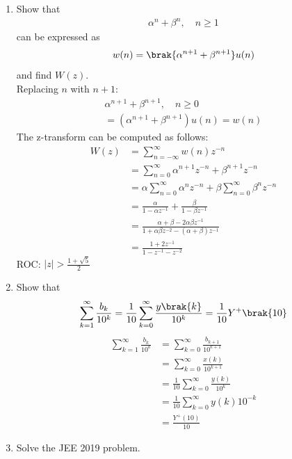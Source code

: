 \documentclass[journal,12pt,twocolumn]{IEEEtran}
\renewcommand\thesection{\arabic{section}}
\begin{document}
\begin{enumerate}[label=\thesection.\arabic*,ref=\thesection.\theenumi]
 \item Show that 
\begin{align}
	\alpha^n + \beta^n, \quad n \ge 1
\end{align}
can be expressed as 
\begin{align}
	w(n) =\brak{\alpha^{n+1} + \beta^{n+1}}u(n)\label{eq:wn}
\end{align}
		and find $W(z)$.\\
		\solution Replacing $n$ with $n+1$:
		\begin{align}
		    \alpha^{n+1} + \beta^{n+1}, \quad n \ge 0\\
		    = (\alpha^{n+1} + \beta^{n+1})u(n) = w(n)
		\end{align}
		The z-transform can be computed as follows:
		\begin{align}
		    W(z) &= \sum_{n=-\infty}^{\infty}w(n)z^{-n}\\
		    &=\sum_{n=0}^{\infty}\alpha^{n+1}z^{-n} + \beta^{n+1}z^{-n}\\
		    &=\alpha\sum_{n=0}^{\infty}\alpha^{n}z^{-n} + \beta\sum_{n=0}^{\infty}\beta^{n}z^{-n}\\ 
		    &= \frac{\alpha}{1-\alpha z^{-1}}+\frac{\beta}{1-\beta z^{-1}}\\
		    &= \frac{\alpha+\beta-2\alpha\beta z^{-1}}{1+\alpha\beta z^{-2} -(\alpha+\beta)z^{-1}}\\
		    &= \frac{1+2z^{-1}}{1-z^{-1}-z^{-2}}
		\end{align}
		ROC: $|z|>\frac{1+\sqrt{5}}{2}$
 \item Show that 
\begin{align}
	\sum_{k=1}^{\infty}\frac{b_k}{10^k} =
	\frac{1}{10}\sum_{k=0}^{\infty}\frac{y\brak{k}}{10^k} =\frac{1}{10}Y^{+}\brak{{10}}
\end{align}
\solution 
\begin{align}
        \sum_{k=1}^{\infty}\frac{b_k}{10^k}&=\sum_{k=0}^{\infty}\frac{b_{k+1}}{10^{k+1}}\\
    	&= \sum_{k=0}^{\infty}\frac{x(k)}{10^{k+1}}\\
        &=\frac{1}{10}\sum_{k=0}^{\infty}\frac{y(k)}{10^{k}}\\
        &=\frac{1}{10}\sum_{k=0}^{\infty}y(k)10^{-k}\\
        &= \frac{Y^+(10)}{10}\label{eq:bz10}
\end{align}
\item Solve the JEE 2019 problem.\\
\solution
\begin{enumerate}[a]

\end{enumerate}
\end{enumerate}
\end{document}
